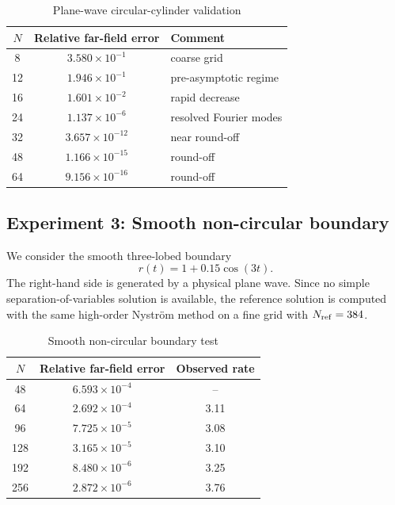 \documentclass[11pt]{article}
\numberwithin{equation}{section}
\begin{document}
\begin{table}[htbp]
\centering
\caption{Plane-wave circular-cylinder validation}
\begin{tabular}{ccl}
\toprule
$N$ & Relative far-field error & Comment\\
\midrule
8  &$3.580\times10^{-1}$&coarse grid\\
12 &$1.946\times10^{-1}$&pre-asymptotic regime\\
16 &$1.601\times10^{-2}$&rapid decrease\\
24 &$1.137\times10^{-6}$&resolved Fourier modes\\
32 &$3.657\times10^{-12}$&near round-off\\
48 &$1.166\times10^{-15}$&round-off\\
64 &$9.156\times10^{-16}$&round-off\\
\bottomrule
\end{tabular}
\end{table}

\subsection{Experiment 3: Smooth non-circular boundary}

We consider the smooth three-lobed boundary
\begin{equation}
r(t)=1+0.15\cos(3t).
\end{equation}
The right-hand side is generated by a physical plane wave. Since no simple separation-of-variables solution is available, the reference solution is computed with the same high-order Nystr\"om method on a fine grid with $N_{\rm ref}=384$.

\begin{table}[htbp]
\centering
\caption{Smooth non-circular boundary test}
\begin{tabular}{ccc}
\toprule
$N$ & Relative far-field error & Observed rate\\
\midrule
48 &$6.593\times10^{-4}$&--\\
64 &$2.692\times10^{-4}$&3.11\\
96 &$7.725\times10^{-5}$&3.08\\
128&$3.165\times10^{-5}$&3.10\\
192&$8.480\times10^{-6}$&3.25\\
256&$2.872\times10^{-6}$&3.76\\
\bottomrule
\end{tabular}
\end{table}
\end{document}

